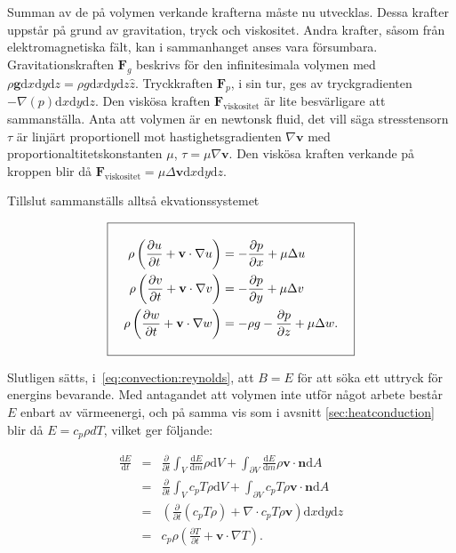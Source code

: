 Summan av de på volymen verkande krafterna måste nu utvecklas. Dessa krafter uppstår på grund av gravitation, tryck och viskositet. Andra krafter, såsom från elektromagnetiska fält, kan i sammanhanget anses vara försumbara. Gravitationskraften $\mathbf{F}_g$ beskrivs för den infinitesimala volymen med $\rho \mathbf{g} \mathrm{d}x\mathrm{d}y\mathrm{d}z = \rho g \mathrm{d}x\mathrm{d}y\mathrm{d}z \hat{z}$. Tryckkraften $\mathbf{F}_p$, i sin tur, ges av tryckgradienten $-\nabla \left( p \right) \mathrm{d}x\mathrm{d}y\mathrm{d}z$. Den viskösa kraften $\mathbf{F}_\text{viskositet}$ är lite besvärligare att sammanställa. Anta att volymen är en newtonsk fluid, det vill säga stresstensorn $\tau$ är linjärt proportionell mot hastighetsgradienten $\nabla\mathbf{v}$ med proportionaltitetskonstanten $\mu$, $\tau = \mu \nabla \mathbf{v}$. Den viskösa kraften verkande på kroppen blir då $\mathbf{F}_\text{viskositet} = \mu\Delta\mathbf{v}\mathrm{d}x\mathrm{d}y\mathrm{d}z$.

Tillslut sammanställs alltså ekvationssystemet

\begin{equation}
\label{eq:convection:momentum}
\addtolength{\fboxsep}{10pt} 
\boxed{ 
\begin{aligned} 
\rho\left(\frac{\partial u}{\partial t} + \mathbf{v}\cdot \nabla u\right) & = -\frac{\partial p}{\partial x} + \mu\Delta u\\
\rho\left(\frac{\partial v}{\partial t} + \mathbf{v}\cdot \nabla v\right) & = -\frac{\partial p}{\partial y} + \mu\Delta v\\
\rho\left(\frac{\partial w}{\partial t} + \mathbf{v}\cdot \nabla w\right) & = -\rho g -\frac{\partial p}{\partial z} + \mu\Delta w.
\end{aligned} 
} 
\end{equation}


Slutligen sätts, i~\eqref{eq:convection:reynolds}, att $B=E$ för att söka ett uttryck för energins bevarande. Med antagandet att volymen inte utför något arbete består $E$ enbart av värmeenergi, och på samma vis som i avsnitt
\ref{sec:heatconduction} blir då $E = c_p \rho dT$, vilket ger följande:

\begin{eqnarray}
\label{reynoldsenergyone}
\frac{\mathrm{d}E}{\mathrm{d}t} & = & \frac{\partial}{\partial t} \int_V \frac{\mathrm{d}E}{\mathrm{d}m}\rho \mathrm{d}V + \int_{\partial V}\frac{\mathrm{d}E}{\mathrm{d}m}\rho \mathbf{v} \cdot \mathbf{n} \mathrm{d}A \nonumber\\
& = & \frac{\partial}{\partial t} \int_V c_p T \rho \mathrm{d}V + \int_{\partial V} c_p T \rho \mathbf{v} \cdot \mathbf{n} \mathrm{d}A \nonumber\\
& = & \left(\frac{\partial}{\partial t} \left( c_p T \rho \right) + \nabla\cdot c_p T \rho \mathbf{v}\right) \mathrm{d}x\mathrm{d}y\mathrm{d}z \nonumber\\
& = & c_p \rho \left( \frac{\partial T}{\partial t} + \mathbf{v}\cdot \nabla T\right).
\end{eqnarray}

